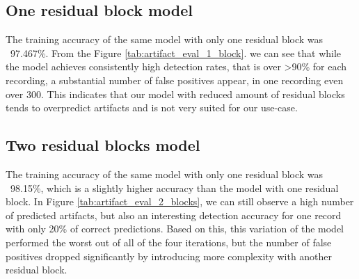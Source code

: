\documentclass[12pt,a4paper,titlepage,openany]{report}
\begin{document}
\subsection{One residual block model}

The training accuracy of the same model with only one residual block was ~97.467\%.
From the Figure \ref{tab:artifact_eval_1_block}. we can see that while the model achieves consistently high detection rates, that is over \textgreater90\% for each recording, a substantial number of false positives appear, in one recording even over 300. This indicates that our model with reduced amount of residual blocks tends to overpredict artifacts and is not very suited for our use-case.

\begin{table}[htbp]
\centering
{}
\caption{Artifact-level evaluation of model predictions with one residual block}
\label{tab:artifact_eval_1_block}
\end{table}


\subsection{Two residual blocks model}

The training accuracy of the same model with only one residual block was ~98.15\%, which is a slightly higher accuracy than the model with one residual block.
In Figure \ref{tab:artifact_eval_2_blocks}, we can still observe a high number of predicted artifacts, but also an interesting detection accuracy for one record with only 20\% of correct predictions. Based on this, this variation of the model performed the worst out of all of the four iterations, but the number of false positives dropped significantly by introducing more complexity with another residual block.
\end{document}
